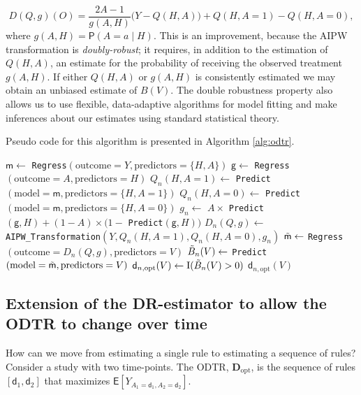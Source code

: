 \documentclass[11pt]{article}
\renewcommand{\d}{\mathsf{d}}
\newcommand{\m}{\mathsf{m}}
\newcommand{\g}{\mathsf{g}}
\newcommand{\E}{\mathsf{E}}
\renewcommand{\Pr}{\mathsf{P}}
\theoremstyle{example}
\begin{document}
\begin{equation}\label{eif1}
  D(Q,g)(O) = \frac{2A - 1}{g(A,H)} \Big( Y - Q(H, A) \Big) + Q(H, A = 1) - Q(H, A = 0),  
\end{equation}
where $g(A,H) = \Pr(A = a \mid H)$. This is an improvement, because the AIPW transformation is \emph{doubly-robust}; it requires, in addition to the estimation of $Q(H, A)$, an estimate for the probability of receiving the observed treatment $g(A,H)$. If either $Q(H, A)$ or $g(A,H)$ is consistently estimated we may obtain an unbiased estimate of $B(V)$. The double robustness property also allows us to use flexible, data-adaptive algorithms for model fitting and make inferences about our estimates using standard statistical theory.

Pseudo code for this algorithm is presented in Algorithm \ref{alg:odtr}.

\begin{algorithm}[H]
\caption{Estimation of $\d_{\text{opt}}$}\label{alg:odtr}
\begin{algorithmic}[1]
\State $\m \gets$ \texttt{Regress}$(\text{outcome} = Y, \text{predictors} = \{H, A\})$
\State $\g \gets$ \texttt{Regress}$(\text{outcome} = A, \text{predictors} = H)$
\State $Q_n(H, A = 1) \gets$ \texttt{Predict}$(\text{model} = \m, \text{predictors} = \{H, A = 1\})$
\State $Q_n(H, A = 0) \gets$ \texttt{Predict}$(\text{model} = \m, \text{predictors} = \{H, A = 0\})$
\State $g_n \gets$ $A \times$ \texttt{Predict}$(\g, H) + (1 - A) \times (1 - $ \texttt{Predict}$(\g, H))$
\State $D_n(Q, g) \gets$ \texttt{AIPW\_Transformation}$(Y, Q_n(H, A = 1), Q_n(H, A = 0), g_n)$ 
\State $\Tilde{\m} \gets$ \texttt{Regress}$(\text{outcome} = D_n(Q, g), \text{predictors} = V)$
\State $\Tilde{B}_n(V) \gets$ \texttt{Predict}$(\text{model} = \Tilde{\m}, \text{predictors} = V)$
\State $\d_{n, \text{opt}}(V) \gets \mathrm{I}(\Tilde{B}_n(V) > 0)$ 
\State \Return $\d_{n, \text{opt}}(V)$ 
\end{algorithmic}
\end{algorithm}

\subsection*{Extension of the DR-estimator to allow the ODTR to change over time}

How can we move from estimating a single rule to estimating a sequence of rules? Consider a study with two time-points. The ODTR, $\mathbf{D}_{\text{opt}}$, is the sequence of rules $[\d_1, \d_2]$ that maximizes $\E[Y_{A_1 = \d_1, A_2 = \d_2}]$. 
\end{document}
